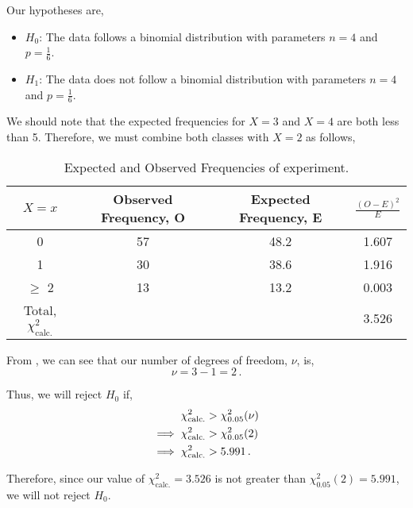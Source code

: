 \begin{subquestions}

\subquestion

Our hypotheses are,
\begin{itemize}
	\item $H_0$: The data follows a binomial distribution with parameters $n=4$ and $p=\frac{1}{6}$. 
	\item $H_1$: The data does not follow a binomial distribution with parameters $n=4$ and $p=\frac{1}{6}$.
\end{itemize}

We should note that the expected frequencies for $X=3$ and $X=4$ are both less than 5. Therefore, we must combine both classes with $X=2$ as follows,
\begin{table}[H]
	\centering
	\begin{tabular}{|c|c|c|c|}
		\hline 
		$X=x$ & Observed Frequency, O & Expected Frequency, E & $\frac{(O-E)^2}{E}$ \\
		\hline
		0 & 57 & 48.2 & 1.607 \\
		1 & 30 & 38.6 & 1.916 \\
		$\geq$ 2 & 13 & 13.2 & 0.003 \\
		\hline
		Total, $\chi^2_\text{calc.}$ & & & 3.526 \\
		\hline
	\end{tabular}
	\caption{\label{2008M:q3:ChiTab} Expected and Observed Frequencies of experiment.}
\end{table}

From , we can see that our number of degrees of freedom, $\nu$, is,
\begin{equation}
	\nu = 3 - 1 = 2 \,.
\end{equation}

Thus, we will reject $H_0$ if,
\begin{align}
	\chi^2_\text{calc.} & > \chi^2_{0.05}(\nu) \nonumber \\
	\implies \chi^2_\text{calc.} & > \chi^2_{0.05}(2) \nonumber \\
	\implies \chi^2_\text{calc.} & > 5.991 \,.
\end{align}

Therefore, since our value of $\chi^2_\text{calc.}=3.526$ is not greater than $\chi^2_{0.05}(2)=5.991$, we will not reject $H_0$.

\end{subquestions}
